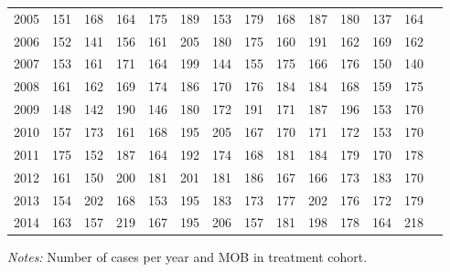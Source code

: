 \begin{table}[H]
\begin{threeparttable}
{\begin{tabular}{l*{13}{c}}
2005        &         151&         168&         164&         175&         189&         153&         179&         168&         187&         180&         137&         164\\
2006        &         152&         141&         156&         161&         205&         180&         175&         160&         191&         162&         169&         162\\
2007        &         153&         161&         171&         164&         199&         144&         155&         175&         166&         176&         150&         140\\
2008        &         161&         162&         169&         174&         186&         170&         176&         184&         184&         168&         159&         175\\
2009        &         148&         142&         190&         146&         180&         172&         191&         171&         187&         196&         153&         170\\
2010        &         157&         173&         161&         168&         195&         205&         167&         170&         171&         172&         153&         170\\
2011        &         175&         152&         187&         164&         192&         174&         168&         181&         184&         179&         170&         178\\
2012        &         161&         150&         200&         181&         201&         181&         186&         167&         166&         173&         183&         170\\
2013        &         154&         202&         168&         153&         195&         183&         173&         177&         202&         176&         172&         179\\
2014        &         163&         157&         219&         167&         195&         206&         157&         181&         198&         178&         164&         218\\
 \bottomrule \end{tabular} } \begin{tablenotes} \item \scriptsize \emph{Notes:} Number of cases per year and MOB in treatment cohort. \end{tablenotes} \end{threeparttable} \end{table} 
